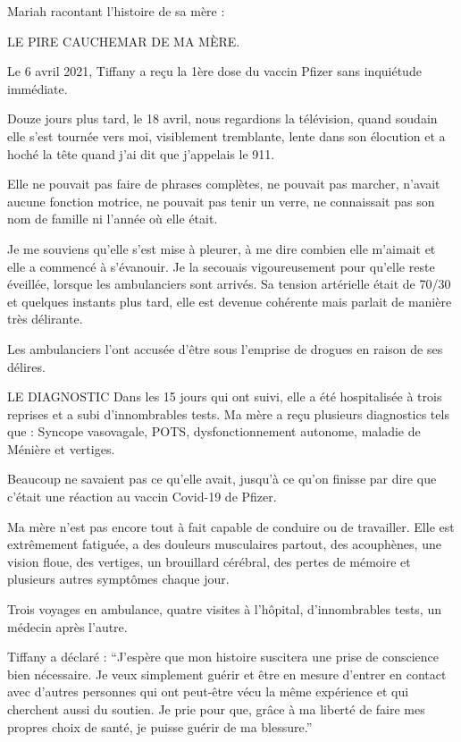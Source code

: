 Mariah racontant l'histoire de sa mère :

LE PIRE CAUCHEMAR DE MA MÈRE.

Le 6 avril 2021, Tiffany a reçu la 1ère dose du vaccin Pfizer sans inquiétude
immédiate.

Douze jours plus tard, le 18 avril, nous regardions la télévision, quand soudain
elle s'est tournée vers moi, visiblement tremblante, lente dans son élocution et
a hoché la tête quand j'ai dit que j'appelais le 911.

Elle ne pouvait pas faire de phrases complètes, ne pouvait pas marcher, n'avait
aucune fonction motrice, ne pouvait pas tenir un verre, ne connaissait pas son
nom de famille ni l'année où elle était.

Je me souviens qu'elle s'est mise à pleurer, à me dire combien elle m'aimait et
elle a commencé à s'évanouir. Je la secouais vigoureusement pour qu'elle reste
éveillée, lorsque les ambulanciers sont arrivés. Sa tension artérielle était de
70/30 et quelques instants plus tard, elle est devenue cohérente mais parlait de
manière très délirante.

Les ambulanciers l'ont accusée d'être sous l'emprise de drogues en raison de ses
délires.

LE DIAGNOSTIC Dans les 15 jours qui ont suivi, elle a été hospitalisée à trois
reprises et a subi d'innombrables tests. Ma mère a reçu plusieurs diagnostics
tels que : Syncope vasovagale, POTS, dysfonctionnement autonome, maladie de
Ménière et vertiges.

Beaucoup ne savaient pas ce qu'elle avait, jusqu'à ce qu'on finisse par dire que
c'était une réaction au vaccin Covid-19 de Pfizer.

Ma mère n'est pas encore tout à fait capable de conduire ou de travailler. Elle
est extrêmement fatiguée, a des douleurs musculaires partout, des acouphènes,
une vision floue, des vertiges, un brouillard cérébral, des pertes de mémoire et
plusieurs autres symptômes chaque jour.

Trois voyages en ambulance, quatre visites à l'hôpital, d'innombrables tests, un
médecin après l'autre.

Tiffany a déclaré : ``J'espère que mon histoire suscitera une prise de
conscience bien nécessaire. Je veux simplement guérir et être en mesure d'entrer
en contact avec d'autres personnes qui ont peut-être vécu la même expérience et
qui cherchent aussi du soutien. Je prie pour que, grâce à ma liberté de faire
mes propres choix de santé, je puisse guérir de ma blessure.''
